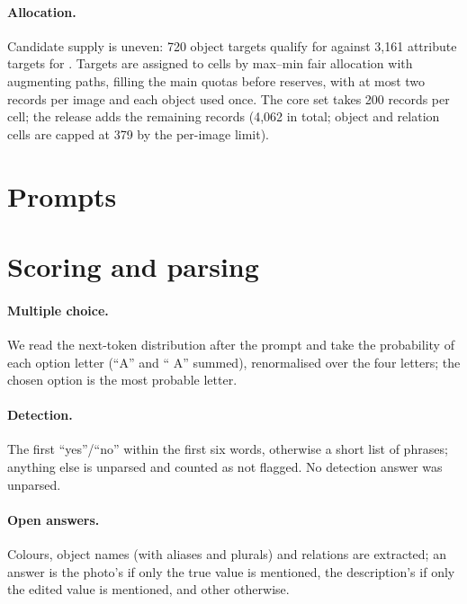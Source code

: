 \documentclass[10pt,twocolumn,letterpaper]{article}
\begin{document}
\paragraph{Allocation.} Candidate supply is uneven: 720 object targets qualify for \Sone against 3,161 attribute targets for \Sthree. Targets are assigned to cells by max--min fair allocation with augmenting paths, filling the main quotas before reserves, with at most two records per image and each object used once. The core set takes 200 records per cell; the release adds the remaining records (4,062 in total; object and relation cells are capped at 379 by the per-image limit).

\section{Prompts}
\label{sec:s-prompts}


\section{Scoring and parsing}
\label{sec:s-parse}

\paragraph{Multiple choice.} We read the next-token distribution after the prompt and take the probability of each option letter (``A'' and `` A'' summed), renormalised over the four letters; the chosen option is the most probable letter.

\paragraph{Detection.} The first ``yes''/``no'' within the first six words, otherwise a short list of phrases; anything else is unparsed and counted as not flagged. No detection answer was unparsed.

\paragraph{Open answers.} Colours, object names (with aliases and plurals) and relations are extracted; an answer is the photo's if only the true value is mentioned, the description's if only the edited value is mentioned, and other otherwise.
\end{document}
